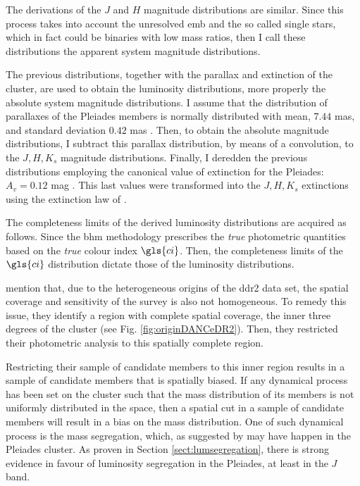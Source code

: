 The derivations of the $J$ and $H$ magnitude distributions are similar. Since this process takes into account the unresolved \gls{emb} and the so called single stars, which in fact could be binaries with low mass ratios, then I call these distributions the apparent system magnitude distributions. 

The previous distributions, together with the parallax and extinction of the cluster, are used to obtain the luminosity distributions, more properly the absolute system magnitude distributions. I assume that the distribution of parallaxes of the Pleiades members is normally distributed with mean, $7.44$ mas, and standard deviation $0.42$ mas \citep{Galli2017}. Then, to obtain the absolute magnitude distributions, I subtract this parallax distribution, by means of a convolution, to the $J,H,K_s$ magnitude distributions. Finally, I deredden the previous distributions employing the canonical value of extinction for the Pleiades: $A_v=0.12$ mag \citep{Guthrie1987}. This last values were transformed into the $J,H,K_s$ extinctions using the extinction law of \citet{Cardelli1989}.

The completeness limits of the derived luminosity distributions are acquired as follows. Since the \gls{bhm} methodology prescribes the \emph{true} photometric quantities based on the \emph{true} colour index $\gls{ci}$. Then, the completeness limits of the $\gls{ci}$ distribution dictate those of the luminosity distributions. 

\citet{Bouy2015} mention that, due to the heterogeneous origins of the \gls{ddr2} data set, the spatial coverage and sensitivity of the survey is also not homogeneous. To remedy this issue, they identify a region with complete spatial coverage, the inner three degrees of the cluster (see Fig. \ref{fig:originDANCeDR2}). Then, they restricted their photometric analysis to this spatially complete region. 

Restricting their sample of candidate members to this inner region results in a sample of candidate members that is spatially biased. If any dynamical process has been set on the cluster such that the mass distribution of its members is not uniformly distributed in the space, then a spatial cut in a sample of candidate members will result in a bias on the mass distribution. One of such dynamical process is the mass segregation, which, as suggested by \citet{Adams2001} may have happen in the Pleiades cluster. As proven in Section \ref{sect:lumsegregation}, there is strong evidence in favour of luminosity segregation in the Pleiades, at least in the $J$ band.


